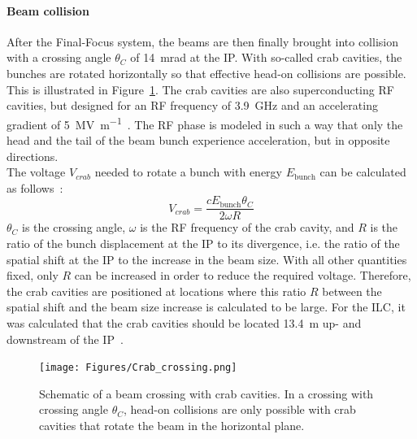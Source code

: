 \paragraph{Beam collision}
After the Final-Focus system, the beams are then finally brought into collision with a crossing angle $\theta_C$ of \SI{14}{\milli\radian} at the IP\cite[p. 9-10]{TDR1}.
With so-called crab cavities, the bunches are rotated horizontally so that effective head-on collisions are possible.
This is illustrated in Figure~\ref{fig:Crab_crossing}.
The crab cavities are also superconducting RF cavities, but designed for an RF frequency of \SI{3.9}{\giga\hertz} and an accelerating gradient of \SI{5}{\mega\volt\per\meter}~\cite[p. 154]{TDR32}.
The RF phase is modeled in such a way that only the head and the tail of the beam bunch experience acceleration, but in opposite directions.
\\The voltage $V_{crab}$ needed to rotate a bunch with energy $E_{\mathrm{bunch}}$ can be calculated as follows~\cite{Crab_cavities}:
\begin{equation}
 V_{crab}=\frac{cE_{\mathrm{bunch}}\theta_C}{2\omega R}
\end{equation}
$\theta_C$ is the crossing angle, $\omega$ is the RF frequency of the crab cavity, and $R$ is the ratio of the bunch displacement at the IP to its divergence, i.e. the ratio of the spatial shift at the IP to the increase in the beam size.
With all other quantities fixed, only $R$ can be increased in order to reduce the required voltage.
Therefore, the crab cavities are positioned at locations where this ratio $R$ between the spatial shift and the beam size increase is calculated to be large.
For the ILC, it was calculated that the crab cavities should be located \SI{13.4}{\meter} up- and downstream of the IP~\cite[p. 154]{TDR32}.
\begin{figure}
\centering
\texttt{[image: Figures/Crab\_crossing.png]}
\caption[Schematic of a beam crossing with crab cavities]{Schematic of a beam crossing with crab cavities. In a crossing with crossing angle $\theta_C$, head-on collisions are only possible with crab cavities that rotate the beam in the horizontal plane.}
\label{fig:Crab_crossing}
\end{figure}

